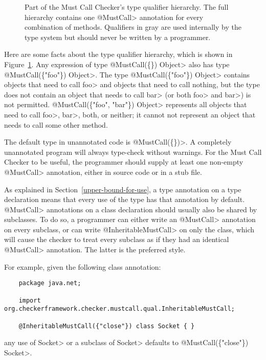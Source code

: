 \begin{figure}
\caption{Part of the Must Call Checker's type
qualifier hierarchy.  The full hierarchy contains one \<@MustCall> annotation
for every combination of methods.
Qualifiers in gray are used internally by the type system but should
never be written by a programmer.}
\label{fig-must-call-hierarchy}
\end{figure}

Here are some facts about the type qualifier hierarchy, which is shown in
Figure~\ref{fig-must-call-hierarchy}.
Any expression of type \<@MustCall(\{\}) Object> also has type
\<@MustCall(\{"foo"\}) Object>.
The type \<@MustCall(\{"foo"\}) Object>
contains objects that need to call \<foo> and objects that need to call
nothing, but the type does not contain an
object that needs to call \<bar> (or both \<foo> and \<bar>) is not permitted.
\<@MustCall(\{"foo", "bar"\}) Object> represents all objects that need to
call \<foo>, \<bar>, both, or neither; it cannot not represent an object that needs
to call some other method.

The default type in unannotated code is \<@MustCall(\{\})>.
A completely unannotated program will always type-check without warnings.
For the Must Call Checker to be useful, the programmer should supply at least one non-empty
\<@MustCall> annotation, either in source code or in a stub file.



As explained in Section~\ref{upper-bound-for-use}, a type
annotation on a type declaration means that every use of the type has that
annotation by default. \<@MustCall> annotations on a class declaration should
usually also be shared by subclasses. To do so, a programmer can either write
an \<@MustCall> annotation on every subclass, or can write \<@InheritableMustCall>
on only the class, which will cause the checker to treat every subclass as if
they had an identical \<@MustCall> annotation.  The latter is the preferred style.

For example, given the following class annotation:
\begin{Verbatim}
    package java.net;

    import org.checkerframework.checker.mustcall.qual.InheritableMustCall;

    @InheritableMustCall({"close"}) class Socket { }
\end{Verbatim}
any use of \<Socket> or a subclass of \<Socket> defaults to \<@MustCall(\{"close"\}) Socket>.

